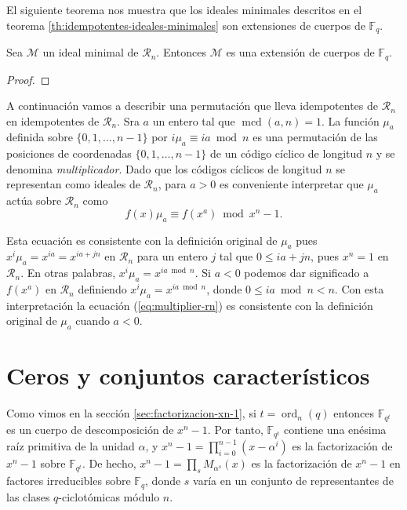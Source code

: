 El siguiente teorema nos muestra que los ideales minimales descritos en el teorema \ref{th:idempotentes-ideales-minimales} son extensiones de cuerpos de \(\mathbb F_q\).

\begin{theorem}
  Sea \(\mathcal M\) un ideal minimal de \(\mathcal R_n\).
  Entonces \(\mathcal M\) es una extensión de cuerpos de \(\mathbb F_q\).
\end{theorem}

\begin{proof}
  
\end{proof}

A continuación vamos a describir una permutación que lleva idempotentes de \(\mathcal R_n\) en idempotentes de \(\mathcal R_n\).
Sra \(a\) un entero tal que \(\operatorname{mcd}(a, n) = 1\).
La función \(\mu_a\) definida sobre \(\{0, 1, \dots, n -1\}\) por \(i\mu_a \equiv ia \bmod n\) es una permutación de las posiciones de coordenadas \(\{0, 1, \dots, n - 1\}\) de un código cíclico de longitud \(n\) y se denomina \textit{multiplicador}.
Dado que los códigos cíclicos de longitud \(n\) se representan como ideales de \(\mathcal R_n\), para \(a > 0\) es conveniente interpretar que \(\mu_a\) actúa sobre \(\mathcal R_n\) como
\begin{equation}
  \label{eq:multiplier-rn}
  f(x)\mu_a \equiv f(x^a) \bmod x^n - 1.
\end{equation}

Esta ecuación es consistente con la definición original de \(\mu_a\) pues \(x^i\mu_a = x^{ia} = x^{ia + jn}\) en \(\mathcal R_n\) para un entero \(j\) tal que \(0 \leq ia + jn\), pues \(x^n = 1\) en \(\mathcal R_n\).
En otras palabras, \(x^i\mu_a = x^{ia \bmod n}\).
Si \(a < 0\) podemos dar significado a \(f(x^a)\) en \(\mathcal R_n\) definiendo \(x^{i}\mu_a = x^{ia \bmod n}\), donde \(0 \leq ia \bmod n < n\).
Con esta interpretación la ecuación (\ref{eq:multiplier-rn}) es consistente con la definición original de \(\mu_a\) cuando \(a < 0\).


\section{Ceros y conjuntos característicos}

Como vimos en la sección \ref{sec:factorizacion-xn-1}, si \(t = \operatorname{ord}_n(q)\) entonces \(\mathbb F_{q^t}\) es un cuerpo de descomposición de \(x^n - 1\).
Por tanto, \(\mathbb F_{q^t}\) contiene una enésima raíz primitiva de la unidad \(\alpha\), y \(x^n - 1 = \prod_{i=0}^{n-1}(x - \alpha^{i})\) es la factorización de \(x^n - 1\) sobre \(\mathbb F_{q^t}\).
De hecho, \(x^n - 1 = \prod_s M_{\alpha^s}(x)\) es la factorización de \(x^n - 1\) en factores irreducibles sobre \(\mathbb F_q\), donde \(s\) varía en un conjunto de representantes de las clases \(q\)-ciclotómicas módulo \(n\).

